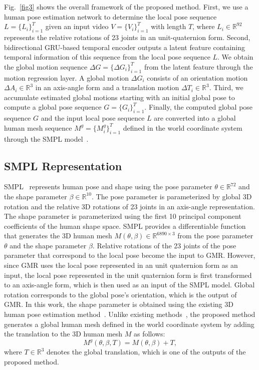 \documentclass[10pt,twocolumn,letterpaper]{article}
\begin{document}
Fig.~\ref{fig3} shows the overall framework of the proposed method. First, we use a human pose estimation network to determine the local pose sequence $L=\{L_{i}\}^{T}_{i=1}$ given an input video $V=\{V_{i}\}^{T}_{i=1}$ with length $T$, where $L_{i}\in{\mathbb{R}^{92}}$ represents the relative rotations of 23 joints in an unit-quaternion form. Second, bidirectional GRU-based temporal encoder outputs a latent feature containing temporal information of this sequence from the local pose sequence $L$. We obtain the global motion sequence $\Delta G=\{\Delta G_{i}\}^{T}_{i=1}$ from the latent feature through the motion regression layer. A global motion $\Delta G_{i}$ consists of an orientation motion $\Delta A_{i}\in{\mathbb{R}^{3}}$ in an axis-angle form and a translation motion $\Delta T_{i}\in{\mathbb{R}^{3}}$. Third, we accumulate estimated global motions starting with an initial global pose to compute a global pose sequence $G=\{G_{i}\}^{T}_{i=1}$. Finally, the computed global pose sequence $G$ and the input local pose sequence $L$ are converted into a global human mesh sequence $M^{g}=\{M^{g}_{i}\}^{T}_{i=1}$ defined in the world coordinate system through the SMPL model~\cite{loper2015smpl}.


\subsection{SMPL Representation}

SMPL~\cite{loper2015smpl} represents human pose and shape using the pose parameter $\theta\in{\mathbb{R}^{72}}$ and the shape parameter $\beta\in{\mathbb{R}^{10}}$. The pose parameter is parameterized by global 3D rotation and the relative 3D rotations of 23 joints in an axis-angle representation. The shape parameter is parameterized using the first 10 principal component coefficients of the human shape space. SMPL provides a differentiable function that generates the 3D human mesh $M(\theta,\beta)\in{\mathbb{R}^{6890\times3}}$ from the pose parameter $\theta$ and the shape parameter $\beta$. Relative rotations of the 23 joints of the pose parameter that correspond to the local pose become the input to GMR. However, since GMR uses the local pose represented in an unit quaternion form as an input, the local pose represented in the unit quaternion form is first transformed to an axis-angle form, which is then used as an input of the SMPL model. Global rotation corresponds to the global pose's orientation, which is the output of GMR. In this work, the shape parameter is obtained using the existing 3D human pose estimation method~\cite{kocabas2020vibe}. Unlike existing methods~\cite{pavlakos2018learning,kanazawa2018end,kolotouros2019learning,kocabas2020vibe,Luo_2020_ACCV}, the proposed method generates a global human mesh defined in the world coordinate system by adding the translation to the 3D human mesh $M$ as follows:
\begin{equation}
\label{eq:human mesh with translation}
    {M^{g}}(\theta,\beta,T)=M(\theta,\beta)+T,
\end{equation}
where $T\in{\mathbb{R}^{3}}$ denotes the global translation, which is one of the outputs of the proposed method.
\end{document}
